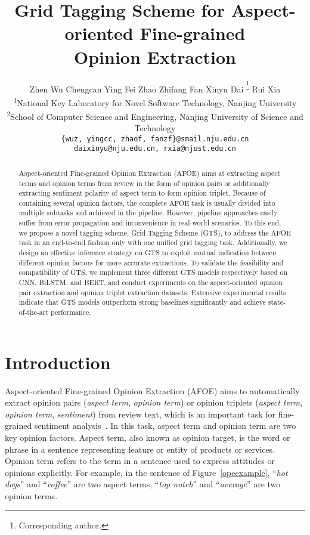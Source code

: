 \documentclass[11pt,a4paper]{article}
\title{Grid Tagging Scheme for Aspect-oriented Fine-grained\\ Opinion Extraction}
\author{
	Zhen Wu\textsuperscript{\normalfont 1 } \quad 
	Chengcan Ying\textsuperscript{\normalfont 1} \quad 
	Fei Zhao\textsuperscript{\normalfont 1} \quad 
	Zhifang Fan\textsuperscript{\normalfont 1} \quad 
	Xinyu Dai\textsuperscript{\normalfont 1 \thanks{ Corresponding author.}} \quad 
	Rui Xia\textsuperscript{\normalfont 2} \\ 
	\textsuperscript{1}National Key Laboratory for Novel Software Technology, Nanjing University \\
	\textsuperscript{2}School of Computer Science and Engineering, Nanjing University of Science and Technology \\
	\texttt{\{wuz, yingcc, zhaof, fanzf\}@smail.nju.edu.cn} \\
	\texttt{daixinyu@nju.edu.cn, rxia@njust.edu.cn} 
}
\date{}
\begin{document}
\maketitle
\begin{abstract}
	Aspect-oriented Fine-grained Opinion Extraction (AFOE) aims at extracting aspect terms and opinion terms from review in the form of opinion pairs or additionally extracting sentiment polarity of aspect term to form opinion triplet. Because of containing several opinion factors, the complete AFOE task is usually divided into multiple subtasks and achieved in the pipeline. However, pipeline approaches easily suffer from error propagation and inconvenience in real-world scenarios. To this end, we propose a novel tagging scheme, Grid Tagging Scheme (GTS), to address the AFOE task in an end-to-end fashion only with one unified grid tagging task. Additionally, we design an effective inference strategy on GTS to exploit mutual indication between different opinion factors for more accurate extractions. To validate the feasibility and compatibility of GTS, we implement three different GTS models respectively based on CNN, BiLSTM, and BERT, and conduct experiments on the aspect-oriented opinion pair extraction and opinion triplet extraction datasets. Extensive experimental results indicate that GTS models outperform strong baselines significantly and achieve state-of-the-art performance.
	
\end{abstract}


\section{Introduction}
Aspect-oriented Fine-grained Opinion Extraction (AFOE) aims to automatically extract opinion pairs (\emph{aspect term}, \emph{opinion term}) or opinion triplets (\emph{aspect term}, \emph{opinion term}, \emph{sentiment}) from review text, which is an important task for fine-grained sentiment analysis~\cite{DBLP:journals/ftir/PangL07,DBLP:series/synthesis/2012Liu}. In this task, aspect term and opinion term are two key opinion factors. Aspect term, also known as opinion target, is the word or phrase in a sentence representing feature or entity of products or services. Opinion term refers to the term in a sentence used to express attitudes or opinions explicitly. For example, in the sentence of Figure~\ref{opeexample},  ``\emph{hot dogs}'' and ``\emph{coffee}'' are two aspect terms, ``\emph{top notch}'' and ``\emph{average}'' are two opinion terms.
\end{document}
